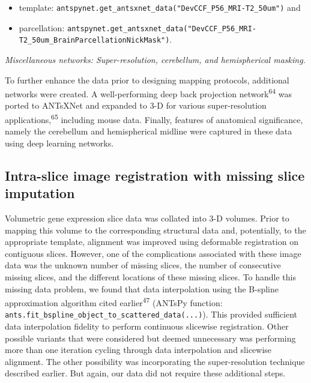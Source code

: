 \documentclass[
  12pt,
]{article}
\begin{document}
\begin{itemize}
\item
  template:
  \texttt{antspynet.get\_antsxnet\_data("DevCCF\_P56\_MRI-T2\_50um")}
  and
\item
  parcellation:
  \texttt{antspynet.get\_antsxnet\_data("DevCCF\_P56\_MRI-T2\_50um\_BrainParcellationNickMask")}.
\end{itemize}

\emph{Miscellaneous networks: Super-resolution, cerebellum, and
hemispherical masking.}

To further enhance the data prior to designing mapping protocols,
additional networks were created. A well-performing deep back projection
network\textsuperscript{64} was ported to ANTsXNet and expanded to 3-D
for various super-resolution applications,\textsuperscript{65} including
mouse data. Finally, features of anatomical significance, namely the
cerebellum and hemispherical midline were captured in these data using
deep learning networks.

\hypertarget{intra-slice-image-registration-with-missing-slice-imputation}{%
\subsection*{Intra-slice image registration with missing slice
imputation}\label{intra-slice-image-registration-with-missing-slice-imputation}}

Volumetric gene expression slice data was collated into 3-D volumes.
Prior to mapping this volume to the corresponding structural data and,
potentially, to the appropriate template, alignment was improved using
deformable registration on contiguous slices. However, one of the
complications associated with these image data was the unknown number of
missing slices, the number of consecutive missing slices, and the
different locations of these missing slices. To handle this missing data
problem, we found that data interpolation using the B-spline
approximation algorithm cited earlier\textsuperscript{47} (ANTsPy
function: \texttt{ants.fit\_bspline\_object\_to\_scattered\_data(...)}).
This provided sufficient data interpolation fidelity to perform
continuous slicewise registration. Other possible variants that were
considered but deemed unnecessary was performing more than one iteration
cycling through data interpolation and slicewise alignment. The other
possibility was incorporating the super-resolution technique described
earlier. But again, our data did not require these additional steps.
\end{document}
